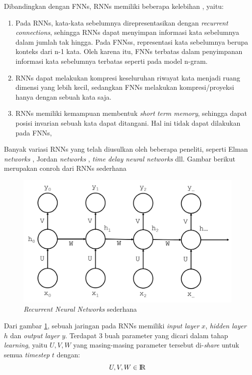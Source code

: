 Dibandingkan dengan FNNs, RNNs memiliki beberapa kelebihan \citep{mikolov2010recurrent}, yaitu:
\begin{enumerate}
	\item Pada RNNs, kata-kata sebelumnya direpresentasikan dengan \textit{recurrent connections}, sehingga RNNs dapat menyimpan informasi kata sebelumnya dalam jumlah tak hingga. Pada FNNss, representasi kata sebelumnya berupa konteks dari n-1 kata. Oleh karena itu, FNNs terbatas dalam penyimpanan informasi kata sebelumnya terbatas seperti pada model n-gram.
	\item RNNs dapat melakukan kompresi keseluruhan riwayat kata menjadi ruang dimensi yang lebih kecil, sedangkan FNNs melakukan kompresi/proyeksi hanya dengan sebuah kata saja.
	\item RNNs memiliki kemampuan membentuk \textit{short term memory}, sehingga dapat posisi invarian sebuah kata dapat ditangani. Hal ini tidak dapat dilakukan pada FNNs,
\end{enumerate}

Banyak variasi RNNs yang telah diusulkan oleh beberapa peneliti, seperti Elman \textit{networks} \citep{elman1990finding}, Jordan \textit{networks} \citep{jordan1986attractor}, \textit{time delay neural networks} \citep{lang1990time} dll. Gambar berikut merupakan conroh  dari RNNs sederhana

\begin{figure}
	\centering
	\includegraphics[width=0.80\linewidth]{images/simple_rnn}
	\caption{\textit{Recurrent Neural Networks} sederhana}
	\label{fig:simple_rnn}
\end{figure}

Dari gambar \ref{fig:simple_rnn}, sebuah jaringan pada RNNs memiliki \textit{input layer} $ x $, \textit{hidden layer} $ h $ dan \textit{output layer} $ y $. Terdapat 3 buah parameter yang dicari dalam tahap \textit{learning}, yaitu $ {U, V, W} $ yang masing-masing parameter tersebut di-\textit{share} untuk semua \textit{timestep} $ t $ dengan:
\begin{equation}\label{equ:euclideandistance}
U, V, W \in {\rm I\!R}
\end{equation}

